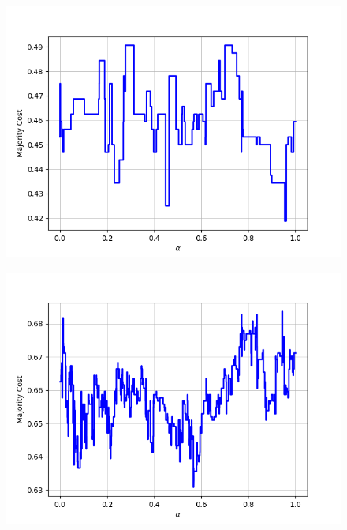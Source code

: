 \begin{figure}[h]
\begin{minipage}{.19\textwidth}
  {\includegraphics[width=\linewidth]{plots/omniglot-intra-ac-cnn/Hebrew}}
\end{minipage}
\begin{minipage}{.19\textwidth}
  \centering
  {\includegraphics[width=\linewidth]{plots/omniglot-intra-ac-cnn/Inuktitut_(Canadian_Aboriginal_Syllabics)}}
\end{minipage}
\begin{minipage}{.19\textwidth}
  \centering

\end{minipage}
\end{figure}
